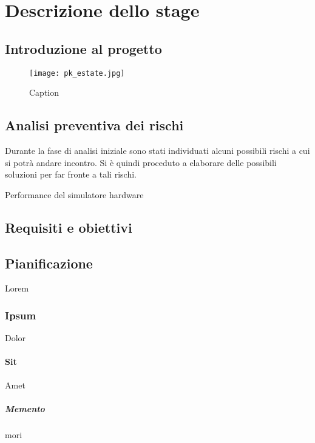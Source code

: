 
\chapter{Descrizione dello stage}
\label{cap:descrizione-stage}


\section{Introduzione al progetto}

\begin{figure}[!ht] 
    \centering 
    \texttt{[image: pk\_estate.jpg]} 
    \caption{Caption}
\end{figure}
\lipsum[1]

\section{Analisi preventiva dei rischi}

Durante la fase di analisi iniziale sono stati individuati alcuni possibili rischi a cui si potrà andare incontro.
Si è quindi proceduto a elaborare delle possibili soluzioni per far fronte a tali rischi.

\begin{risk}{Performance del simulatore hardware}
    \label{risk:hardware-simulator} 
\end{risk}

\section{Requisiti e obiettivi}

\section{Pianificazione}
Lorem

\subsection{Ipsum}
Dolor

\subsubsection{Sit}
Amet

\paragraph{Memento}
mori